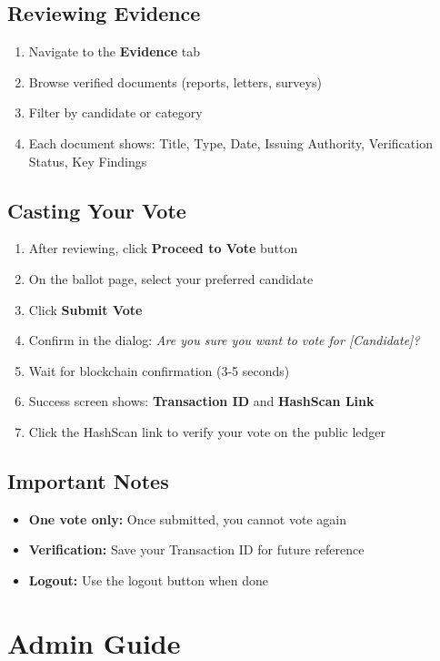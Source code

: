 \subsection{Reviewing Evidence}
\begin{enumerate}
    \item Navigate to the \textbf{Evidence} tab
    \item Browse verified documents (reports, letters, surveys)
    \item Filter by candidate or category
    \item Each document shows: Title, Type, Date, Issuing Authority, Verification Status, Key Findings
\end{enumerate}

\subsection{Casting Your Vote}
\begin{enumerate}
    \item After reviewing, click \textbf{Proceed to Vote} button
    \item On the ballot page, select your preferred candidate
    \item Click \textbf{Submit Vote}
    \item Confirm in the dialog: \textit{Are you sure you want to vote for [Candidate]?}
    \item Wait for blockchain confirmation (3-5 seconds)
    \item Success screen shows: \textbf{Transaction ID} and \textbf{HashScan Link}
    \item Click the HashScan link to verify your vote on the public ledger
\end{enumerate}

\subsection{Important Notes}
\begin{itemize}
    \item \textbf{One vote only:} Once submitted, you cannot vote again
    \item \textbf{Verification:} Save your Transaction ID for future reference
    \item \textbf{Logout:} Use the logout button when done
\end{itemize}

\section{Admin Guide}
\label{sec:admin-guide}

